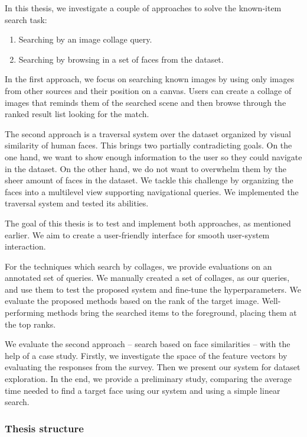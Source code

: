 In this thesis, we investigate a couple of approaches to solve the known-item search task:

\begin{enumerate}
  \item Searching by an image collage query.
  \item Searching by browsing in a set of faces from the dataset.
\end{enumerate}

In the first approach, we focus on searching known images by using only images from other sources and their position on a canvas. Users can create a collage of images that reminds them of the searched scene and then browse through the ranked result list looking for the match.

The second approach is a traversal system over the dataset organized by visual similarity of human faces. This brings two partially contradicting goals. On the one hand, we want to show enough information to the user so they could navigate in the dataset. On the other hand, we do not want to overwhelm them by the sheer amount of faces in the dataset. We tackle this challenge by organizing the faces into a multilevel view supporting navigational queries. We implemented the traversal system and tested its abilities.

The goal of this thesis is to test and implement both approaches, as mentioned earlier. We aim to create a user-friendly interface for smooth user-system interaction.

For the techniques which search by collages, we provide evaluations on an annotated set of queries. We manually created a set of collages, as our queries, and use them to test the proposed system and fine-tune the hyperparameters. We evaluate the proposed methods based on the rank of the target image. Well-performing methods bring the searched items to the foreground, placing them at the top ranks.

We evaluate the second approach -- search based on face similarities -- with the help of a case study. Firstly, we investigate the space of the feature vectors by evaluating the responses from the survey. Then we present our system for dataset exploration. In the end, we provide a preliminary study, comparing the average time needed to find a target face using our system and using a simple linear search.

\subsubsection*{Thesis structure}

